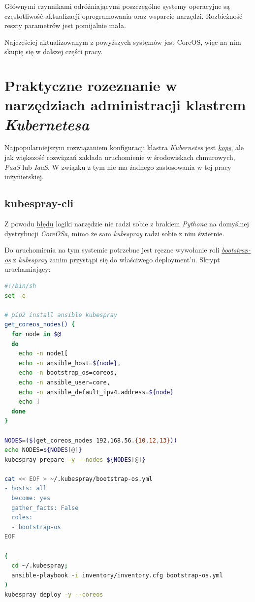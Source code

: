 \documentclass[a4paper,12pt,twoside,openany]{report}
\begin{document}
Głównymi czynnikami odróżniającymi poszczególne systemy operacyjne są
częstotliwość aktualizacji oprogramowania oraz wsparcie narzędzi.
Rozbieżność reszty parametrów jest pomijalnie mała.

Najczęściej aktualizowanym z powyższych systemów jest CoreOS, więc na
nim skupię się w dalszej części pracy.

\hypertarget{praktyczne-rozeznanie-w-narzux119dziach-administracji-klastrem-kubernetesa}{%
\chapter{\texorpdfstring{Praktyczne rozeznanie w narzędziach
administracji klastrem
\emph{Kubernetesa}}{Praktyczne rozeznanie w narzędziach administracji klastrem Kubernetesa}}\label{praktyczne-rozeznanie-w-narzux119dziach-administracji-klastrem-kubernetesa}}

Najpopularniejszym rozwiązaniem konfiguracji klastra \emph{Kubernetes}
jest \href{https://github.com/kubernetes/kops}{\emph{kops}}, ale jak
większość rozwiązań zakłada uruchomienie w środowiskach chmurowych,
\emph{PaaS} lub \emph{IaaS}. W związku z tym nie ma żadnego zastosowania
w tej pracy inżynierskiej.

\hypertarget{kubespray-cli-1}{%
\section{kubespray-cli}\label{kubespray-cli-1}}

Z powodu
\href{https://github.com/kubespray/kubespray-cli/issues/120}{błędu}
logiki narzędzie nie radzi sobie z brakiem \emph{Pythona} na domyślnej
dystrybucji \emph{CoreOSa}, mimo że sam \emph{kubespray} radzi sobie z
nim świetnie.

Do uruchomienia na tym systemie potrzebne jest ręczne wywołanie roli
\href{https://github.com/kubernetes-incubator/kubespray/blob/master/roles/bootstrap-os/tasks/main.yml}{\emph{bootstrap-os}}
z \emph{kubespray} zanim przystąpi się do właściwego deployment'u.
Skrypt uruchamiający:

\begin{lstlisting}[language=bash]
#!/bin/sh
set -e

# pip2 install ansible kubespray
get_coreos_nodes() {
  for node in $@
  do
    echo -n node1[
    echo -n ansible_host=${node},
    echo -n bootstrap_os=coreos,
    echo -n ansible_user=core,
    echo -n ansible_default_ipv4.address=${node}
    echo ]
  done
}

NODES=($(get_coreos_nodes 192.168.56.{10,12,13}))
echo NODES=${NODES[@]}
kubespray prepare -y --nodes ${NODES[@]}

cat << EOF > ~/.kubespray/bootstrap-os.yml
- hosts: all
  become: yes
  gather_facts: False
  roles:
  - bootstrap-os
EOF

(
  cd ~/.kubespray;
  ansible-playbook -i inventory/inventory.cfg bootstrap-os.yml
)
kubespray deploy -y --coreos
\end{lstlisting}
\end{document}
